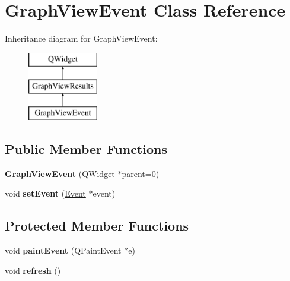\hypertarget{class_graph_view_event}{\section{Graph\-View\-Event Class Reference}
\label{class_graph_view_event}
}
Inheritance diagram for Graph\-View\-Event\-:\begin{figure}[H]
\begin{center}
\leavevmode
\includegraphics[height=3.000000cm]{class_graph_view_event}
\end{center}
\end{figure}
\subsection*{Public Member Functions}
\begin{DoxyCompactItemize}
\item 
\hypertarget{class_graph_view_event_a5ae1e10efd5810bbbbd289097585c399}{{\bfseries Graph\-View\-Event} (Q\-Widget $\ast$parent=0)}\label{class_graph_view_event_a5ae1e10efd5810bbbbd289097585c399}

\item 
\hypertarget{class_graph_view_event_a3e8f622d6750597d01a7500ce12ce34c}{void {\bfseries set\-Event} (\hyperlink{class_event}{Event} $\ast$event)}\label{class_graph_view_event_a3e8f622d6750597d01a7500ce12ce34c}

\end{DoxyCompactItemize}
\subsection*{Protected Member Functions}
\begin{DoxyCompactItemize}
\item 
\hypertarget{class_graph_view_event_a4c8d302cf0f963b4963e3ba0dc19ab8f}{void {\bfseries paint\-Event} (Q\-Paint\-Event $\ast$e)}\label{class_graph_view_event_a4c8d302cf0f963b4963e3ba0dc19ab8f}

\item 
\hypertarget{class_graph_view_event_a2fc0e3c9070ba9c6a89b408244312f1e}{void {\bfseries refresh} ()}\label{class_graph_view_event_a2fc0e3c9070ba9c6a89b408244312f1e}

\end{DoxyCompactItemize}
